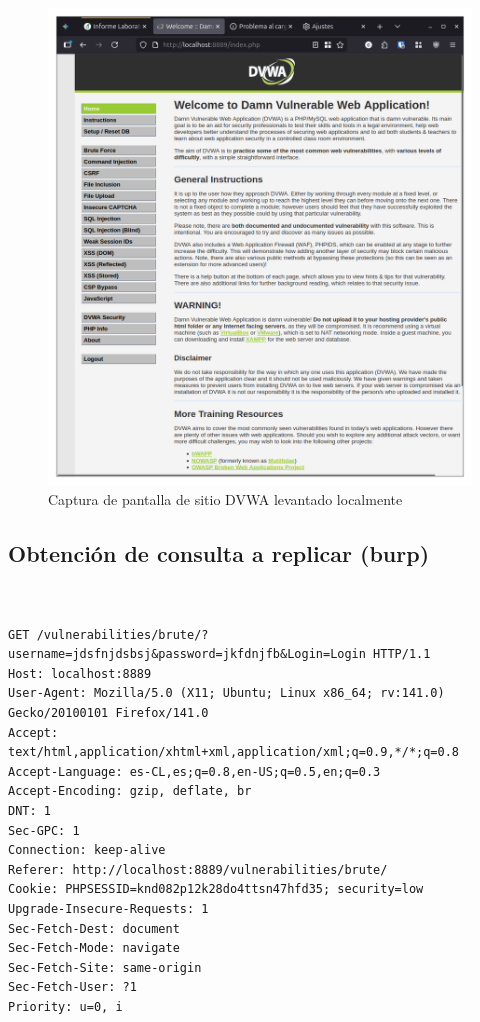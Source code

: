 \documentclass[letter,12pt]{article}
\begin{document}
\begin{figure}
    \centering
    \includegraphics[width=1\linewidth]{levanteyredireccione/Captura desde 2025-10-01 23-14-34.png}
    \caption{Captura de pantalla de sitio DVWA levantado localmente}
    \label{fig:dvwastartscreen}
\end{figure}
\subsection{Obtención de consulta a replicar (burp)}
\begin{verbatim}
    

GET /vulnerabilities/brute/?username=jdsfnjdsbsj&password=jkfdnjfb&Login=Login HTTP/1.1
Host: localhost:8889
User-Agent: Mozilla/5.0 (X11; Ubuntu; Linux x86_64; rv:141.0) Gecko/20100101 Firefox/141.0
Accept: text/html,application/xhtml+xml,application/xml;q=0.9,*/*;q=0.8
Accept-Language: es-CL,es;q=0.8,en-US;q=0.5,en;q=0.3
Accept-Encoding: gzip, deflate, br
DNT: 1
Sec-GPC: 1
Connection: keep-alive
Referer: http://localhost:8889/vulnerabilities/brute/
Cookie: PHPSESSID=knd082p12k28do4ttsn47hfd35; security=low
Upgrade-Insecure-Requests: 1
Sec-Fetch-Dest: document
Sec-Fetch-Mode: navigate
Sec-Fetch-Site: same-origin
Sec-Fetch-User: ?1
Priority: u=0, i


\end{verbatim}
\end{document}
